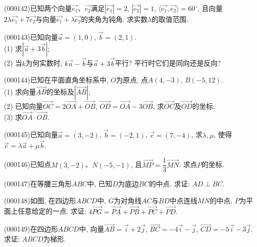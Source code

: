 \item (000142)已知两个向量$\overrightarrow {e_1}$、$\overrightarrow {e_2}$满足$|\overrightarrow {e_1}|=2$, $|\overrightarrow {e_2}|=1$, $\langle \overrightarrow {e_1}, \overrightarrow {e_2}\rangle=60^\circ$, 且向量$2\lambda \overrightarrow {e_1}+7\overrightarrow {e_2}$与向量$\overrightarrow {e_1}+\lambda \overrightarrow {e_2}$的夹角为钝角. 求实数$\lambda$的取值范围.
\item (000143)已知向量$\overrightarrow a=(1, 0)$, $\overrightarrow b=(2, 1)$.\\
(1) 求$|\overrightarrow a+3\overrightarrow b|$;\\
(2) 当$k$为何实数时, $k\overrightarrow a-\overrightarrow b$与$\overrightarrow a+3\overrightarrow b$平行? 平行时它们是同向还是反向?
\item (000144)已知在平面直角坐标系中, $O$为原点, 点$A(4, -3)$, $B(-5, 12)$.\\
(1) 求向量$\overrightarrow{AB}$的坐标及$|\overrightarrow{AB}|$;\\
(2) 已知向量$\overrightarrow{OC}=2\overrightarrow{OA}+\overrightarrow{OB}$, $\overrightarrow{OD}=\overrightarrow{OA}-3\overrightarrow{OB}$, 求$\overrightarrow{OC}$及$\overrightarrow{OD}$的坐标;\\
(3) 求$\overrightarrow{OA}\cdot\overrightarrow{OB}$.
\item (000145)已知向量$\overrightarrow a=(3, -2)$, $\overrightarrow b=(-2, 1)$, $\overrightarrow c=(7, -4)$, 求$\lambda,\mu$, 使得$\overrightarrow c=\lambda \overrightarrow a+\mu \overrightarrow b$.
\item (000146)已知点$M(3, -2)$、$N(-5, -1)$, 且$\overrightarrow{MP}=\dfrac 13\overrightarrow{MN}$. 求点$P$的坐标.
\item (000147)在等腰三角形$ABC$中, 已知$D$为底边$BC$的中点. 求证: $AD\perp BC$.
\item (000148)如图, 在四边形$ABCD$中, $G$为对角线$AC$与$BD$中点连线$MN$的中点, $P$为平面上任意给定的一点. 求证: $4\overrightarrow{PG}=\overrightarrow{PA}+\overrightarrow{PB}+\overrightarrow{PC}+\overrightarrow{PD}$.
\item (000149)在四边形$ABCD$中, 向量$\overrightarrow{AB}=\overrightarrow i+2\overrightarrow j$, $\overrightarrow{BC}=-4\overrightarrow i-\overrightarrow j$, $\overrightarrow{CD}=-5\overrightarrow i-3\overrightarrow j$. 求证: $ABCD$为梯形.
\begin{center}
\end{center}
